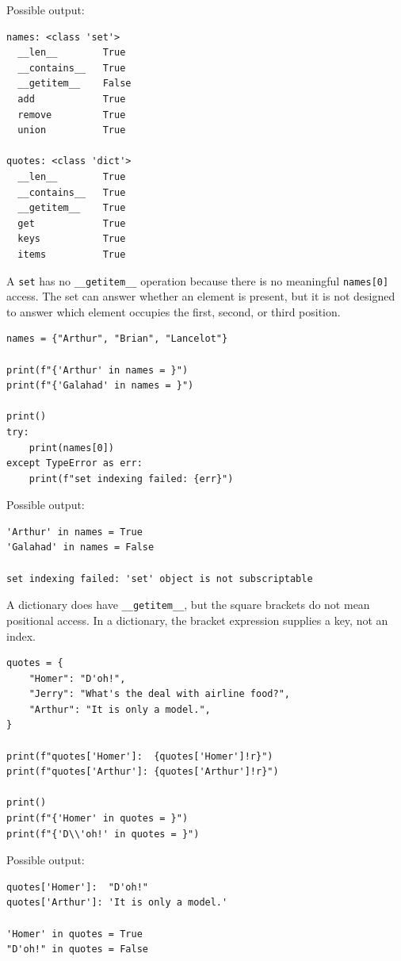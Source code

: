 Possible output:

\begin{verbatim}
names: <class 'set'>
  __len__        True
  __contains__   True
  __getitem__    False
  add            True
  remove         True
  union          True

quotes: <class 'dict'>
  __len__        True
  __contains__   True
  __getitem__    True
  get            True
  keys           True
  items          True
\end{verbatim}

A \texttt{set} has no \texttt{\_\_getitem\_\_} operation because there is no meaningful \texttt{names[0]} access. The set can answer whether an element is present, but it is not designed to answer which element occupies the first, second, or third position.

\begin{verbatim}
names = {"Arthur", "Brian", "Lancelot"}

print(f"{'Arthur' in names = }")
print(f"{'Galahad' in names = }")

print()
try:
    print(names[0])
except TypeError as err:
    print(f"set indexing failed: {err}")
\end{verbatim}

Possible output:

\begin{verbatim}
'Arthur' in names = True
'Galahad' in names = False

set indexing failed: 'set' object is not subscriptable
\end{verbatim}

A dictionary does have \texttt{\_\_getitem\_\_}, but the square brackets do not mean positional access. In a dictionary, the bracket expression supplies a key, not an index.

\begin{verbatim}
quotes = {
    "Homer": "D'oh!",
    "Jerry": "What's the deal with airline food?",
    "Arthur": "It is only a model.",
}

print(f"quotes['Homer']:  {quotes['Homer']!r}")
print(f"quotes['Arthur']: {quotes['Arthur']!r}")

print()
print(f"{'Homer' in quotes = }")
print(f"{'D\\'oh!' in quotes = }")
\end{verbatim}

Possible output:

\begin{verbatim}
quotes['Homer']:  "D'oh!"
quotes['Arthur']: 'It is only a model.'

'Homer' in quotes = True
"D'oh!" in quotes = False
\end{verbatim}

